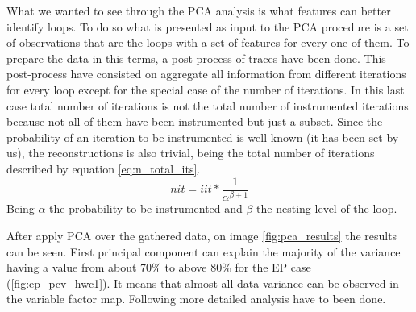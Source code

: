 What we wanted to see through the PCA analysis is what features can better
identify loops. To do so what is presented as input to the PCA procedure is a
set of observations that are the loops with a set of features for every one of
them. To prepare the data in this terms, a post-process of traces have been
done. This post-process have consisted on aggregate all information from different
iterations for every loop except for the special case of the number of iterations. 
In this last case total number of iterations is not the
total number of instrumented iterations because not all of them have been
instrumented but just a subset. Since the probability of an iteration to be
instrumented is well-known (it has been set by us), the reconstructions is also
trivial, being the total number of iterations described by equation
\ref{eq:n_total_its}.
\begin{equation}
  \label{eq:n_total_its}
  nit = iit*\frac{1}{\alpha^{\beta+1}}
\end{equation}
Being $\alpha$ the probability to be instrumented and $\beta$ the nesting level
of the loop.

After apply PCA over the gathered data, on image \ref{fig:pca_results} the
results can be seen. First principal component can explain the majority of the 
variance having a value from about 70\% to above 80\% for the EP case 
(\ref{fig:ep_pcv_hwc1}). It means that almost all data variance can be observed
in the variable factor map. Following more detailed analysis have to been done.


